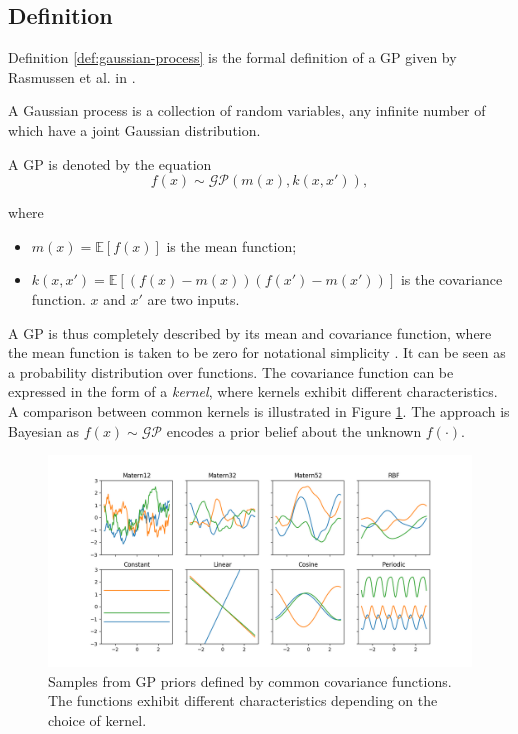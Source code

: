 \subsection{Definition}

Definition \ref{def:gaussian-process} is the formal definition of a GP given by Rasmussen et al. in \cite{Rasmussen2006}.
\begin{definition} \label{def:gaussian-process}
    A Gaussian process is a collection of random variables, any infinite number of which have a joint Gaussian distribution.
\end{definition}

A GP is denoted by the equation
\begin{equation} \label{eq:GP-eq1}
    f(x) \sim \mathcal{GP}(m(x), k(x, x')),
\end{equation}

where 
\begin{itemize}
    \item $m(x) = \mathbb{E}[f(x)]$ is the mean function;
    \item $k(x, x') = \mathbb{E}[(f(x) - m(x))(f(x') - m(x'))]$ is the covariance function.
    $x$ and $x'$ are two inputs.
\end{itemize}

A GP is thus completely described by its mean and covariance function, where the mean function is taken to be zero for notational simplicity \cite{Rasmussen2006}.
It can be seen as a probability distribution over functions.
The covariance function can be expressed in the form of a \textit{kernel}, where kernels exhibit different characteristics.
A comparison between common kernels is illustrated in Figure \ref{fig:gp-kernels}.
The approach is Bayesian as \(f(x) \sim \mathcal{GP}\) encodes a prior belief about the unknown $f(\cdot)$.

\begin{figure} [t!]
    \centering
    \includegraphics[width=\textwidth]{figures/gp_kernels}
    \caption[Samples from GP priors defined by common covariance functions]
    {\small Samples from GP priors defined by common covariance functions. 
    The functions exhibit different characteristics depending on the choice of kernel.}
    \label{fig:gp-kernels}
\end{figure}

